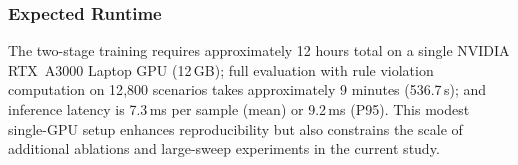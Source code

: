 \subsubsection{Expected Runtime}

The two-stage training requires approximately 12 hours total on a single NVIDIA RTX~A3000 Laptop GPU (12\,GB); full evaluation with rule violation computation on 12{,}800 scenarios takes approximately 9 minutes (536.7\,s); and inference latency is 7.3\,ms per sample (mean) or 9.2\,ms (P95). This modest single-GPU setup enhances reproducibility but also constrains the scale of additional ablations and large-sweep experiments in the current study.
